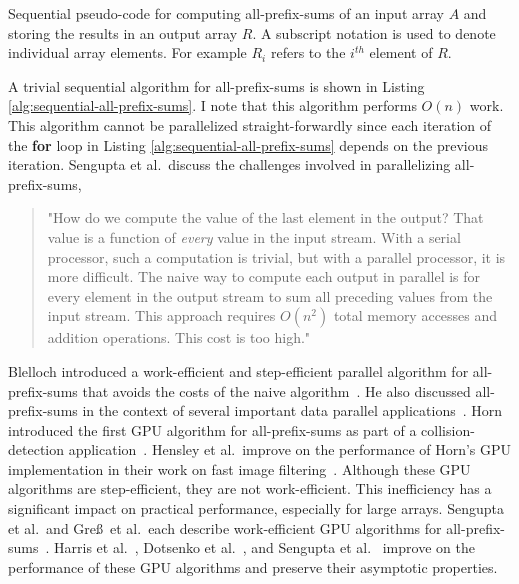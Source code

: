 \begin{Listing}[t]
    \caption{Sequential pseudo-code for computing all-prefix-sums of an input array $A$ and storing the results in an output array $R$. A subscript notation is used to denote individual array elements. For example $R_{i}$ refers to the $i^{th}$ element of $R$. }
    \begin{algorithmic}[1]
        \ENDFOR
    \end{algorithmic}
    \label{alg:sequential-all-prefix-sums}
\end{Listing}

A trivial sequential algorithm for all-prefix-sums is shown in Listing \ref{alg:sequential-all-prefix-sums}. I note that this algorithm performs $O(n)$ work. This algorithm cannot be parallelized straight-forwardly since each iteration of the \textbf{for} loop in Listing \ref{alg:sequential-all-prefix-sums} depends on the previous iteration. Sengupta et al.\ discuss the challenges involved in parallelizing all-prefix-sums,

\begin{quotation}
"How do we compute the value of the last element in the output? That value is a function of \emph{every} value in the input stream. With a serial processor, such a computation is trivial, but with a parallel processor, it is more difficult. The naive way to compute each output in parallel is for every element in the output stream to sum all preceding values from the input stream. This approach requires $O(n^2)$ total memory accesses and addition operations. This cost is too high."~\cite{Sengupta-2007}
\end{quotation}

Blelloch introduced a work-efficient and step-efficient parallel algorithm for all-prefix-sums that avoids the costs of the naive algorithm~\cite{Blelloch-1993}. He also discussed all-prefix-sums in the context of several important data parallel applications~\cite{Blelloch-1993}. Horn introduced the first GPU algorithm for all-prefix-sums as part of a collision-detection application~\cite{Horn-2005}. Hensley et al.\ improve on the performance of Horn's GPU implementation in their work on fast image filtering~\cite{Hensley-2005}. Although these GPU algorithms are step-efficient, they are not work-efficient. This inefficiency has a significant impact on practical performance, especially for large arrays. Sengupta et al.\ and Gre\ss \ et al.\ each describe work-efficient GPU algorithms for all-prefix-sums~\cite{Sengupta-2006,Greb-2006}. Harris et al.~\cite{Harris-2007}, Dotsenko et al.~\cite{Dotsenko-2008}, and Sengupta et al.~\cite{Sengupta-2011} improve on the performance of these GPU algorithms and preserve their asymptotic properties.~\cite{Sengupta-2007}

